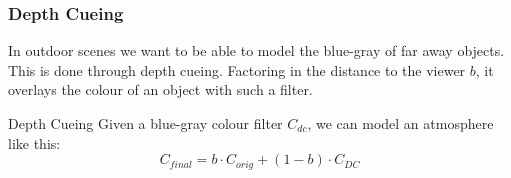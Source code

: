 \documentclass{panikzettel}
\begin{document}
\begin{halfboxl}
\vspace{-\baselineskip}
\subsubsection*{Depth Cueing}

In outdoor scenes we want to be able to model the blue-gray of far away objects. This is done through depth cueing. Factoring in the distance to the viewer $b$, it overlays the colour of an object with such a filter.
\end{halfboxl}%
\begin{halfboxr}
\vspace{-\baselineskip}
\begin{defi}{Depth Cueing}
Given a blue-gray colour filter $C_{dc}$, we can model an atmosphere like this:
$$C_{final} = b \cdot C_{orig} + (1-b) \cdot C_{DC}$$
\end{defi}
\end{halfboxr}
\end{document}
